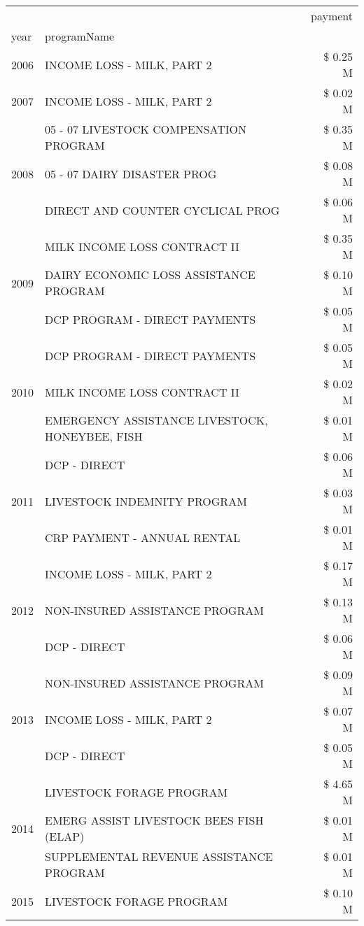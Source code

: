 \begin{tabular}{llr}
\toprule
 &  & payment \\
year & programName &  \\
\midrule
2006 & INCOME LOSS - MILK, PART 2 & \$ 0.25 M \\
\cline{1-3}
2007 & INCOME LOSS - MILK, PART 2 & \$ 0.02 M \\
\cline{1-3}
\multirow[t]{3}{*}{2008} & 05 - 07 LIVESTOCK COMPENSATION PROGRAM & \$ 0.35 M \\
 & 05 - 07 DAIRY DISASTER PROG & \$ 0.08 M \\
 & DIRECT AND COUNTER CYCLICAL PROG & \$ 0.06 M \\
\cline{1-3}
\multirow[t]{3}{*}{2009} & MILK INCOME LOSS CONTRACT II & \$ 0.35 M \\
 & DAIRY ECONOMIC LOSS ASSISTANCE PROGRAM & \$ 0.10 M \\
 & DCP PROGRAM - DIRECT PAYMENTS & \$ 0.05 M \\
\cline{1-3}
\multirow[t]{3}{*}{2010} & DCP PROGRAM - DIRECT PAYMENTS & \$ 0.05 M \\
 & MILK INCOME LOSS CONTRACT II & \$ 0.02 M \\
 & EMERGENCY ASSISTANCE LIVESTOCK, HONEYBEE, FISH & \$ 0.01 M \\
\cline{1-3}
\multirow[t]{3}{*}{2011} & DCP - DIRECT & \$ 0.06 M \\
 & LIVESTOCK INDEMNITY PROGRAM & \$ 0.03 M \\
 & CRP PAYMENT - ANNUAL RENTAL & \$ 0.01 M \\
\cline{1-3}
\multirow[t]{3}{*}{2012} & INCOME LOSS - MILK, PART 2 & \$ 0.17 M \\
 & NON-INSURED ASSISTANCE PROGRAM & \$ 0.13 M \\
 & DCP - DIRECT & \$ 0.06 M \\
\cline{1-3}
\multirow[t]{3}{*}{2013} & NON-INSURED ASSISTANCE PROGRAM & \$ 0.09 M \\
 & INCOME LOSS - MILK, PART 2 & \$ 0.07 M \\
 & DCP - DIRECT & \$ 0.05 M \\
\cline{1-3}
\multirow[t]{3}{*}{2014} & LIVESTOCK FORAGE PROGRAM & \$ 4.65 M \\
 & EMERG ASSIST LIVESTOCK BEES FISH (ELAP) & \$ 0.01 M \\
 & SUPPLEMENTAL REVENUE ASSISTANCE PROGRAM & \$ 0.01 M \\
\cline{1-3}
\multirow[t]{3}{*}{2015} & LIVESTOCK FORAGE PROGRAM & \$ 0.10 M \\

\end{tabular}
